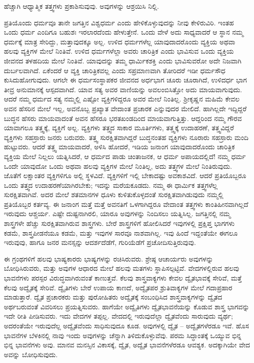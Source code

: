 ಹೆಚ್ಚಾಗಿ ಆಧ್ಯಾತ್ಮಿಕ ತತ್ತ್ವಗಳು ಪ್ರಕಾಶಿಸುವುವು. ಅವುಗಳನ್ನು ಆಶ್ರಯಿಸಿ ನಿಲ್ಲಿ.

ಪ್ರತಿಯೊಂದು ಧರ್ಮವೂ ತಾನೇ ಜಗತ್ತಿನ ವಿಶ್ವಧರ್ಮ ಎಂದು ಹೇಳಿಕೊಳ್ಳುವುದನ್ನು ನೀವು ಕೇಳಿರುವಿರಿ. ಇಂತಹ ಒಂದು ಧರ್ಮ ಎಂದಿಗೂ ಬಹುಶಃ ಇರಲಾರದೆಂದು ಹೇಳುತ್ತೇನೆ. ಒಂದು ವೇಳೆ ಅದು ಸಾಧ್ಯವಾದರೆ ಆ ಸ್ಥಾನ ನಮ್ಮ ಧರ್ಮಕ್ಕೆ ಮಾತ್ರ ಸೇರಿದ್ದು, ಮತ್ತಾವುದಕ್ಕೂ ಅಲ್ಲ. ಉಳಿದ ಧರ್ಮಗಳೆಲ್ಲ ಯಾವುದಾದರೊಂದು ವ್ಯಕ್ತಿಯ ಅಥವಾ ಹಲವು ವ್ಯಕ್ತಿಗಳ ಮೇಲೆ ನಿಂತಿವೆ. ಉಳಿದ ಧರ್ಮಗಳೆಲ್ಲಾ ಅವರು ಚಾರಿತ್ರಿಕ ಎಂದು ಭಾವಿಸುವ ಒಂದು ವ್ಯಕ್ತಿಯ ಜೀವನದ ತಳಹದಿಯ ಮೇಲೆ ನಿಂತಿವೆ. ಯಾವುದನ್ನು ತಮ್ಮ ಧಾರ್ಮಿಕಶಕ್ತಿ ಎಂದು ಭಾವಿಸುವರೋ ಅದೇ ನಿಜವಾಗಿ ದುರ್ಬಲವಾಗಿದೆ. ಏಕೆಂದರೆ ಆ ವ್ಯಕ್ತಿ ಚಾರಿತ್ರಿಕವಲ್ಲ ಎಂದು ಸಪ್ರಮಾಣವಾಗಿ ತೋರಿದರೆ ಇಡೀ ಧರ್ಮಸೌಧ ಕುಸಿದುಹೋಗುವುದು. ಆಗಲೇ ಈ ಧರ್ಮಸಂಸ್ಥಾಪಕರ ಜೀವನದ ಅರ್ಧಭಾಗ ಚೂರು ಚೂರಾಗಿದೆ, ಉಳಿದರ್ಧ ಭಾಗ ತೀವ್ರ ಅನುಮಾನಕ್ಕೆ ಆಸ್ಪದವಾಗಿದೆ. ಯಾವ ಸತ್ಯ ಅವರ ವಾಣಿಯನ್ನು ಅವಲಂಬಿಸಿತ್ತೋ ಅದು ಮಾಯವಾಗುವುದು. ಆದರೆ ನಮ್ಮ ಧರ್ಮದ ಸತ್ಯ ನಮ್ಮಲ್ಲಿ ಎಷ್ಟೋ ವ್ಯಕ್ತಿಗಳಿದ್ದರೂ ಅವರ ಮೇಲೆ ನಿಂತಿಲ್ಲ. ಶ‍್ರೀಕೃಷ್ಣನ ಮಹಿಮೆ ಕೇವಲ ಅವನ ಹೆಸರಿನ ಮೇಲೆ ಇಲ್ಲ, ಅವನೊಬ್ಬ ಪ್ರಖ್ಯಾತ ವೇದಾಂತ ಪ್ರಚಾರಕ ಎನ್ನುವುದರ ಮೇಲಿದೆ. ಹಾಗಿಲ್ಲದೇ ಇದ್ದಿದ್ದರೆ ಬುದ್ಧನ ಹೆಸರು ಮಾಯವಾದಂತೆ ಅವನ ಹೆಸರೂ ಭರತಖಂಡದಿಂದ ಮಾಯವಾಗುತ್ತಿತ್ತು. ಆದ್ದರಿಂದ ನಮ್ಮ ಗೌರವ ಯಾವಾಗಲೂ ತತ್ತ್ವಕ್ಕೆ, ವ್ಯಕ್ತಿಗೆ ಅಲ್ಲ. ವ್ಯಕ್ತಿಗಳು ತತ್ತ್ವದ ಸಾಕಾರ ಮೂರ್ತಿಗಳು, ತತ್ತ್ವಕ್ಕೆ ಉದಾಹರಣೆ, ತತ್ತ್ವವಿದ್ದರೆ ವ್ಯಕ್ತಿಗಳು ಸಹಸ್ರಾರು ಜನರು ಬರುವರು. ತತ್ತ್ವ ಸುರಕ್ಷಿತವಾಗಿದ್ದರೆ ಬುದ್ಧನಂತಹ ವ್ಯಕ್ತಿಗಳು ನೂರಾರು ಸಹಸ್ರಾರು ಮಂದಿ ಹುಟ್ಟುವರು. ಆದರೆ ತತ್ತ್ವ ಮಾಯವಾದರೆ, ಅಳಿಸಿ ಹೋದರೆ, ಇಡಿಯ ಜನಾಂಗ ಯಾವುದಾದರೊಂದು ಚಾರಿತ್ರಿಕ ವ್ಯಕ್ತಿಯ ಮೇಲೆ ನಿಲ್ಲಲು ಯತ್ನಿಸಿದರೆ, ಆ ಧರ್ಮದ ಪಾಡು ಚಿಂತಾಜನಕ, ಆ ಧರ್ಮ ಅಪಾಯದಲ್ಲಿದೆ! ನಮ್ಮ ಧರ್ಮ ಒಂದೇ ಯಾವುದೋ ಒಂದು ಅಥವಾ ಹಲವು ವ್ಯಕ್ತಿಗಳ ಮೇಲೆ ನಿಂತಿಲ್ಲ, ಅದು ತತ್ತ್ವಗಳ ಮೇಲೆ ನಿಂತಿರುವುದು. ಜೊತೆಗೆ ಲಕ್ಷಾಂತರ ವ್ಯಕ್ತಿಗಳಿಗೂ ಅಲ್ಲಿ ಸ್ಥಳವಿದೆ. ವ್ಯಕ್ತಿಗಳಿಗೆ ಇಲ್ಲಿ ಬೇಕಾದಷ್ಟು ಅವಕಾಶವಿದೆ. ಆದರೆ ಪ್ರತಿಯೊಬ್ಬರೂ ಒಂದು ತತ್ತ್ವದ ಉದಾಹರಣೆಯಾಗಿರಬೇಕು; ಇದನ್ನು ಮರೆಯಕೂಡದು. ನಮ್ಮ ಈ ಧಾರ್ಮಿಕ ತತ್ತ್ವಗಳೆಲ್ಲ ಸುರಕ್ಷಿತವಾಗಿವೆ. ಅದರ ಮೇಲೆ ಶತಮಾನಗಳ ಧೂಳು ಕುಳಿತುಕೊಳ್ಳದಂತೆ ಸುರಕ್ಷಿತವಾಗಿಡುವುದು ನಮ್ಮಲ್ಲಿ ಪ್ರತಿಯೊಬ್ಬರ ಕರ್ತವ್ಯ. ಈ ಜನಾಂಗ ಮತ್ತೆ ಮತ್ತೆ ಅವನತಿಗೆ ಒಳಗಾಗಿದ್ದರೂ ವೇದಾಂತ ತತ್ತ್ವಗಳು ಕಾಂತಿಹೀನವಾಗಿಲ್ಲದೆ ಇರುವುದು ಆಶ್ಚರ್ಯ. ಎಷ್ಟೇ ದುಷ್ಟನಾಗಿರಲಿ, ಯಾರೂ ಅವುಗಳನ್ನು ನಿಂದಿಸಲು ಯತ್ನಿಸಿಲ್ಲ. ಜಗತ್ತಿನಲ್ಲಿ ನಮ್ಮ ಶಾಸ್ತ್ರಗಳೇ ಹೆಚ್ಚು ಸುರಕ್ಷಿತವಾಗಿರುವ ಶಾಸ್ತ್ರಗಳು. ಬೇರೆ ಶಾಸ್ತ್ರಗಳಿಗೆ ಹೋಲಿಸಿದರೆ ಇವುಗಳಲ್ಲಿ ಪ್ರಕ್ಷಿಪ್ತ ಭಾಗಗಳು ಕಡಮೆ, ಶಾಸ್ತ್ರಪೀಡನೆಯೂ ಕಡಮೆ, ಮತ್ತು ಇವುಗಳ ಸಾರವೂ ನಾಶವಾಗಿಲ್ಲ. ಇವು ಹಿಂದೆ ಇದ್ದಂತೆಯೇ ಈಗಲೂ ಇರುವುವು, ಹಾಗೂ ಜನರ ಮನಸ್ಸನ್ನು ಆದರ್ಶದೆಡೆಗೆ, ಗುರಿಯೆಡೆಗೆ ಪ್ರಚೋದಿಸುತ್ತಿರುವುವು.

ಈ ಗ್ರಂಥಗಳಿಗೆ ಹಲವು ಭಾಷ್ಯಕಾರರು ಭಾಷ್ಯಗಳನ್ನು ರಚಿಸಿರುವರು. ಶ್ರೇಷ್ಠ ಆಚಾರ್ಯರು ಅವುಗಳನ್ನು ಬೋಧಿಸಿರುವರು, ಮತ್ತು ಅವುಗಳ ಆಧಾರದ ಮೇಲೆ ಹಲವು ಮತಗಳು ಸ್ಥಾಪಿಸಲ್ಪಟ್ಟಿವೆ. ವೇದಗಳಲ್ಲಿರುವ ಹಲವು ಭಾವನೆಗಳು ಪರಸ್ಪರ ವಿರುದ್ಧವಾಗಿರುವಂತೆ ಕಾಣುತ್ತವೆ. ಕೆಲವು ಶಾಸ್ತ್ರವಾಕ್ಯಗಳು ಕೇವಲ ದ್ವೈತಭಾವಕ್ಕೆ ಸೇರಿವೆ, ಮತ್ತೆ ಕೆಲವು ಅದ್ವೈತಕ್ಕೆ ಸೇರಿವೆ. ದ್ವೈತಿಗಳು ಬೇರೆ ಉಪಾಯ ಕಾಣದೆ, ಅದ್ವೈತಪರ ಶ್ರುತಿವಾಕ್ಯಗಳ ಮೇಲೆ ಗದಾಪ್ರಹಾರ ಮಾಡುತ್ತಾರೆ. ದ್ವೈತ ಪ್ರಚಾರಕರು ಮತ್ತು ಪುರೋಹಿತರು ಅದ್ವೈತಕ್ಕೆ ಸಂಬಂಧಿಸಿದ ಶಾಸ್ತ್ರವಾಕ್ಯಗಳನ್ನು ದ್ವೈತದ ಅರ್ಥಬರುವಂತೆ ವಿವರಿಸಲು ಪ್ರಯತ್ನಿಸುವರು. ಹಾಗೆಯೇ ಅದ್ವೈತಿಗಳು ದ್ವೈತಭಾವನೆಯನ್ನು ಕೊಡುವ ಶಾಸ್ತ್ರ ಭಾಗವನ್ನು ಇದೇ ರೀತಿ ಪೀಡಿಸುವರು. ಇದು ವೇದಗಳ ತಪ್ಪಲ್ಲ. ವೇದದಲ್ಲಿ ಇರುವುದೆಲ್ಲಾ ದ್ವೈತವೆಂದು ಸಾರುವುದು ವ್ಯರ್ಥ; ಅದರಂತೆಯೇ ಇರುವುದೆಲ್ಲ ಅದ್ವೈತವೆಂದು ಸಾಧಿಸುವುದೂ ಕೂಡ. ಅವುಗಳಲ್ಲಿ ದ್ವೈತ – ಅದ್ವೈತಗಳೆರಡೂ ಇವೆ. ಹೊಸ ಭಾವನೆಗಳ ಬೆಳಕಿನಲ್ಲಿ ನಾವು ಇಂದು ಅವುಗಳನ್ನು ಚೆನ್ನಾಗಿ ತಿಳಿದುಕೊಳ್ಳುವೆವು. ಪರಮ ಸಿದ್ಧಾಂತಕ್ಕೆ ಒಯ್ಯುವ ಭಿನ್ನ ಭಿನ್ನ ಭಾವನೆಗಳು ಅವು. ಮಾನವ ಮನಸ್ಸಿನ ವಿಕಾಸಕ್ಕೆ, ದ್ವೈತ, ಅದ್ವೈತ ಭಾವನೆಗಳೆರಡೂ ಆವಶ್ಯಕ. ಅದಕ್ಕಾಗಿಯೇ ವೇದ ಅವನ್ನು ಬೋಧಿಸುವುದು.

